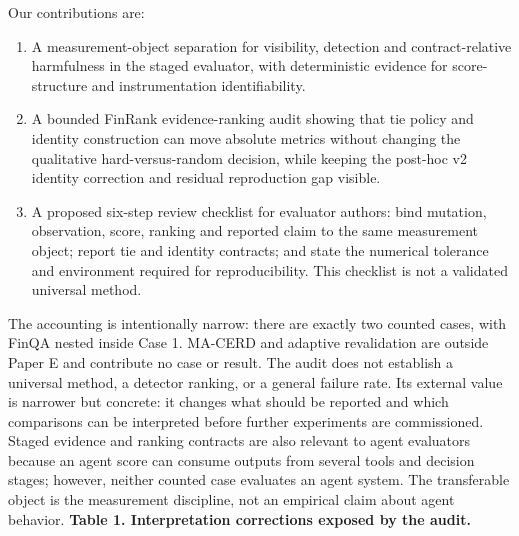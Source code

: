 \documentclass[10pt]{article}
\begin{document}
Our contributions are:
\begin{enumerate}
\item A measurement-object separation for visibility, detection and contract-relative harmfulness in the staged evaluator, with deterministic evidence for score-structure and instrumentation identifiability.
\item A bounded FinRank evidence-ranking audit showing that tie policy and identity construction can move absolute metrics without changing the qualitative hard-versus-random decision, while keeping the post-hoc v2 identity correction and residual reproduction gap visible.
\item A proposed six-step review checklist for evaluator authors: bind mutation, observation, score, ranking and reported claim to the same measurement object; report tie and identity contracts; and state the numerical tolerance and environment required for reproducibility. This checklist is not a validated universal method.
\end{enumerate}
The accounting is intentionally narrow: there are exactly two counted cases, with FinQA nested inside Case 1. MA-CERD and adaptive revalidation are outside Paper E and contribute no case or result. The audit does not establish a universal method, a detector ranking, or a general failure rate. Its external value is narrower but concrete: it changes what should be reported and which comparisons can be interpreted before further experiments are commissioned.
Staged evidence and ranking contracts are also relevant to agent evaluators because an agent score can consume outputs from several tools and decision stages; however, neither counted case evaluates an agent system. The transferable object is the measurement discipline, not an empirical claim about agent behavior.
\textbf{Table 1. Interpretation corrections exposed by the audit.}
\end{document}
